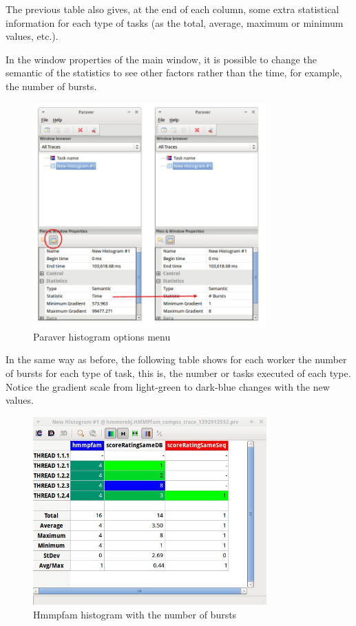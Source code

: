 The previous table also gives, at the end of each column, some extra statistical 
information for each type of tasks (as the total, average, maximum or minimum values, etc.).

\newpage
In the window properties of the main window, it is possible to change the semantic of the statistics 
to see other factors rather than the time, for example, the number of bursts.

\begin{figure}[ht!]
  \centering
    \includegraphics[width=0.8\textwidth]{./Sections/5_Analysis/Figures/14.jpeg}
    \caption{Paraver histogram options menu}
\end{figure}

\newpage
In the same way as before, the following table shows for each worker the number of bursts 
for each type of task, this is, the number or tasks executed of each type. Notice the gradient 
scale from light-green to dark-blue changes with the new values.

\begin{figure}[ht!]
  \centering
    \includegraphics[width=0.8\textwidth]{./Sections/5_Analysis/Figures/15.jpeg}
    \caption{Hmmpfam histogram with the number of bursts}
\end{figure}